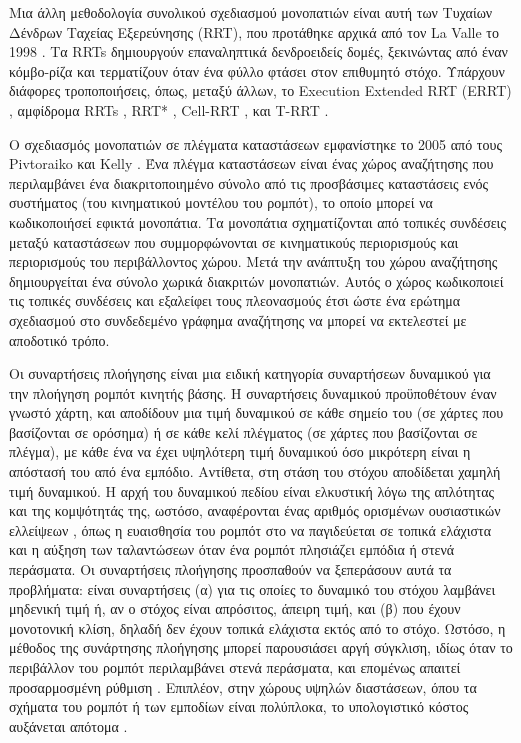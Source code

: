 Μια άλλη μεθοδολογία συνολικού σχεδιασμού μονοπατιών είναι αυτή των Τυχαίων
Δένδρων Ταχείας Εξερεύνησης (RRT), που προτάθηκε αρχικά από τον La Valle το
1998 \cite{Lavalle1998}. Τα RRTs δημιουργούν επαναληπτικά δενδροειδείς δομές,
ξεκινώντας από έναν κόμβο-ρίζα και τερματίζουν όταν ένα φύλλο φτάσει στον
επιθυμητό στόχο. Υπάρχουν διάφορες τροποποιήσεις, όπως, μεταξύ άλλων, το
Execution Extended RRT (ERRT) \cite{Bruce}, αμφίδρομα RRTs \cite{Martin2007},
RRT* \cite{Karaman2010}, Cell-RRT \cite{Guitton2009}, και T-RRT
\cite{Jaillet2010}.

Ο σχεδιασμός μονοπατιών σε πλέγματα καταστάσεων εμφανίστηκε το 2005 από τους
Pivtoraiko και Kelly \cite{MikhailPivtoraiko2005}. Ένα πλέγμα καταστάσεων είναι
ένας χώρος αναζήτησης που περιλαμβάνει ένα διακριτοποιημένο σύνολο από τις
προσβάσιμες καταστάσεις ενός συστήματος (του κινηματικού μοντέλου του ρομπότ),
το οποίο μπορεί να κωδικοποιήσεί εφικτά μονοπάτια. Τα μονοπάτια σχηματίζονται
από τοπικές συνδέσεις μεταξύ καταστάσεων που συμμορφώνονται σε κινηματικούς
περιορισμούς και περιορισμούς του περιβάλλοντος χώρου. Μετά την ανάπτυξη του
χώρου αναζήτησης δημιουργείται ένα σύνολο χωρικά διακριτών μονοπατιών. Αυτός ο
χώρος κωδικοποιεί τις τοπικές συνδέσεις και εξαλείφει τους πλεονασμούς έτσι
ώστε ένα ερώτημα σχεδιασμού στο συνδεδεμένο γράφημα αναζήτησης να μπορεί να
εκτελεστεί με αποδοτικό τρόπο.

Οι συναρτήσεις πλοήγησης είναι μια ειδική κατηγορία συναρτήσεων δυναμικού
\cite{Latombe1991} για την πλοήγηση ρομπότ κινητής βάσης. Η συναρτήσεις
δυναμικού προϋποθέτουν έναν γνωστό χάρτη, και αποδίδουν μια τιμή δυναμικού σε
κάθε σημείο του (σε χάρτες που βασίζονται σε ορόσημα) ή σε κάθε κελί πλέγματος
(σε χάρτες που βασίζονται σε πλέγμα), με κάθε ένα να έχει υψηλότερη τιμή
δυναμικού όσο μικρότερη είναι η απόστασή του από ένα εμπόδιο.  Αντίθετα, στη
στάση του στόχου αποδίδεται χαμηλή τιμή δυναμικού. Η αρχή του δυναμικού πεδίου
είναι ελκυστική λόγω της απλότητας και της κομψότητάς της, ωστόσο, αναφέρονται
ένας αριθμός ορισμένων ουσιαστικών ελλείψεων \cite{Koren}\cite{Ge2000}, όπως η
ευαισθησία του ρομπότ στο να παγιδεύεται σε τοπικά ελάχιστα και η αύξηση των
ταλαντώσεων όταν ένα ρομπότ πλησιάζει εμπόδια ή στενά περάσματα. Οι συναρτήσεις
πλοήγησης προσπαθούν να ξεπεράσουν αυτά τα προβλήματα: είναι συναρτήσεις (α)
για τις οποίες το δυναμικό του στόχου λαμβάνει μηδενική τιμή ή, αν ο στόχος
είναι απρόσιτος, άπειρη τιμή, και (β) που έχουν μονοτονική κλίση, δηλαδή δεν
έχουν τοπικά ελάχιστα εκτός από το στόχο. Ωστόσο, η μέθοδος της συνάρτησης
πλοήγησης μπορεί παρουσιάσει αργή σύγκλιση, ιδίως όταν το περιβάλλον του ρομπότ
περιλαμβάνει στενά περάσματα, και επομένως απαιτεί προσαρμοσμένη ρύθμιση
\cite{Kowalczyk2019}. Επιπλέον, στην χώρους υψηλών διαστάσεων, όπου τα σχήματα
του ρομπότ ή των εμποδίων είναι πολύπλοκα, το υπολογιστικό κόστος αυξάνεται
απότομα \cite{Park2016}.

